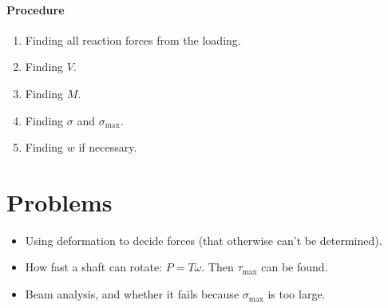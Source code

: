 \documentclass[hyperref, a4paper]{article}
\begin{document}
\paragraph*{Procedure} 
\begin{enumerate}
    \item Finding all reaction forces from the loading.
    \item Finding $V$. 
    \item Finding $M$.
    \item Finding $\sigma$ and $\sigma_{\text{max}}$.
    \item Finding $w$ if necessary.
\end{enumerate}

\section{Problems}

\begin{itemize}
    \item Using deformation to decide forces (that otherwise can't be determined).
    \item How fast a shaft can rotate: $P = T \omega$. Then $\tau_{\text{max}}$ can be found.
    \item Beam analysis, and whether it fails because $\sigma_{\text{max}}$ is too large.
\end{itemize}
\end{document}
